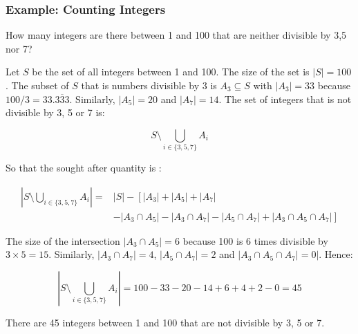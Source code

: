 \subsubsection{Example: Counting Integers}

How many integers are there between 1 and 100 that are neither divisible by 3,5 nor 7?

Let $S$ be the set of all integers between 1 and 100. The size of the set is $|S| = 100$. The subset of $S$ that is numbers divisible by 3 is $A_3 \subseteq S$ with $|A_3| = 33$ because $100/3 = 33.\overline{333}$. Similarly, $|A_5| = 20$ and $|A_7| = 14$.  The set of integers that is not divisible by 3, 5 or 7 is:

\begin{equation}
S \setminus \bigcup_{i\in\{3,5,7\}} A_i
\end{equation}

So that the sought after quantity is :

\begin{equation}
\begin{array}{rl}
\left|S \setminus \bigcup_{i\in\{3,5,7\}} A_i\right| =& |S| - \left[ |A_3| + |A_5| + |A_7| \right.\\
& \left. - |A_3 \cap A_5| - |A_3 \cap A_7| - |A_5\cap A_7| + |A_3\cap A_5\cap A_7|\right]
\end{array}
\end{equation}

The size of the intersection $|A_3\cap A_5| = 6$ because 100 is 6 times divisible by $3\times 5 = 15$. Similarly, $|A_3 \cap A_7| =  4$, $|A_5 \cap A_7| =  2$ and $|A_3\cap A_5 \cap A_7| =  0|$. Hence:

\begin{equation}
\left|S \setminus \bigcup_{i\in\{3,5,7\}} A_i\right| = 100 - 33 - 20 - 14 + 6 + 4 + 2 - 0 = 45
\end{equation}

There are 45 integers between 1 and 100 that are not divisible by 3, 5 or 7.